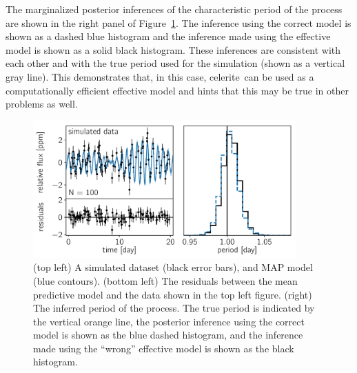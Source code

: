 \documentclass[manuscript, letterpaper]{aastex6}
\makeatletter
\let\origsubsection\subsection
\renewcommand\subsection{\@ifstar{\starsubsection}{\nostarsubsection}}
\newcommand\nostarsubsection[1]{\subsectionprelude\origsubsection{#1}}
\newcommand\starsubsection[1]{\subsectionprelude\origsubsection*{#1}}
\newcommand\subsectionprelude{\vspace{1em}}
\newcommand{\project}[1]{\textsf{#1}}
\newcommand{\celerite}{\project{celerite}}
\newcommand{\figureref}[1]{\ref{fig:#1}}
\newcommand{\Figure}[1]{Figure~\figureref{#1}}
\newcommand{\figurelabel}[1]{\label{fig:#1}}
\newcommand{\sectlabel}[1]{\label{sect:#1}}
\makeatother
\begin{document}
{The marginalized posterior inferences of the characteristic period of the
process are shown in the right panel of \Figure{simulated-wrong}.
The inference using the correct model is shown as a dashed blue histogram and
the inference made using the effective model is shown as a solid black
histogram.
These inferences are consistent with each other and with the true period used
for the simulation (shown as a vertical gray line).
This demonstrates that, in this case, \celerite\ can be used as a
computationally efficient effective model and hints that this may be true in
other problems as well.
}



\begin{figure}[!htbp]
\begin{center}
\includegraphics[width=0.9\textwidth]{figures/simulated/wrong-qpo.pdf}
\caption{(top left) A simulated dataset (black error bars), and MAP
    model (blue contours).
    (bottom left) The residuals between the mean predictive model and the data
    shown in the top left figure.
    (right) The inferred period of the process. The true period is indicated
    by the vertical orange line, the posterior inference using the correct
    model is shown as the blue dashed histogram, and the inference made using
    the ``wrong'' effective model is shown as the black histogram.
    \figurelabel{simulated-wrong}}
\end{center}
\end{figure}


\subsection{Example 3: Stellar rotation} \sectlabel{rotation}
\end{document}
